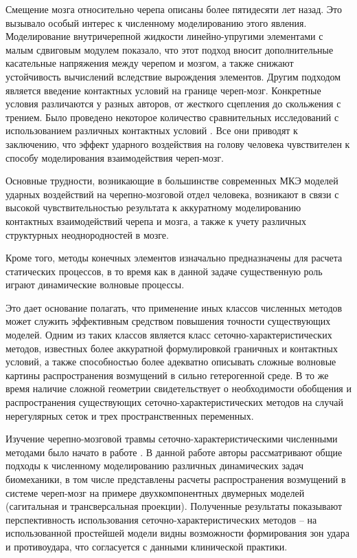 Смещение мозга относительно черепа описаны более пятидесяти лет назад. Это вызывало особый интерес к численному моделированию этого явления. Моделирование внутричерепной жидкости линейно-упругими элементами с малым сдвиговым модулем \cite{zhou} показало, что этот подход вносит дополнительные касательные напряжения между черепом и мозгом, а также снижают устойчивость вычислений вследствие вырождения элементов. Другим подходом является введение контактных условий на границе череп-мозг. Конкретные условия различаются у разных авторов, от жесткого сцепления до скольжения с трением. Было проведено некоторое количество сравнительных исследований с использованием различных контактных условий \cite{claessens}. Все они приводят к заключению, что эффект ударного воздействия на голову человека чувствителен к способу моделирования взаимодействия череп-мозг. 

Основные трудности, возникающие в большинстве современных МКЭ моделей ударных воздействий на черепно-мозговой отдел человека, возникают в связи с высокой чувствительностью результата к аккуратному моделированию контактных взаимодействий черепа и мозга, а также к учету различных структурных неоднородностей в мозге.

Кроме того, методы конечных элементов изначально предназначены для расчета статических процессов, в то время как в данной задаче существенную роль играют динамические волновые процессы.

Это дает основание полагать, что применение иных классов численных методов может служить эффективным средством повышения точности существующих моделей. Одним из таких классов является класс сеточно-характеристических методов, известных более аккуратной формулировкой граничных и контактных условий, а также способностью более адекватно описывать сложные волновые картины распространения возмущений в сильно гетерогенной среде. В то же время наличие сложной геометрии свидетельствует о необходимости обобщения и распространения существующих сеточно-характеристических методов на случай нерегулярных сеток и трех пространственных переменных.

Изучение черепно-мозговой травмы сеточно-характеристическими численными методами было начато в работе \cite{biomech_first}. В данной работе авторы рассматривают общие подходы к численному моделированию различных динамических задач биомеханики, в том числе представлены расчеты распространения возмущений в системе череп-мозг на примере двухкомпонентных двумерных моделей (сагитальная и трансверсальная проекции). Полученные результаты показывают перспективность использования сеточно-характеристических методов – на использованной простейшей модели видны возможности формирования зон удара и противоудара, что согласуется с данными клинической практики.

